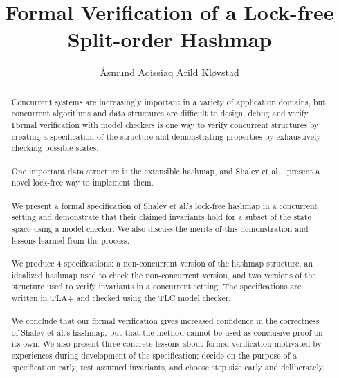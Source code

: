 \documentclass{uit-thesis}
\begin{document}
\title{Formal Verification of a Lock-free Split-order Hashmap}
\author{Åsmund Aqissiaq Arild Kløvstad}

\maketitle

\frontmatter

\begin{epigraph}
\end{epigraph}

\tableofcontents

\begin{abstract}
    Concurrent systems are increasingly important in a variety of application domains, but concurrent algorithms and data structures are difficult to design, debug and verify. Formal verification with model checkers is one way to verify concurrent structures by creating a specification of the structure and demonstrating properties by exhaustively checking possible states.\\\\
    One important data structure is the extensible hashmap, and Shalev et al.~\cite{Shalev2006} present a novel lock-free way to implement them.
    \\\\%
    We present a formal specification of Shalev et al.'s lock-free hashmap in a concurrent setting and demonstrate that their claimed invariants hold for a subset of the state space using a model checker. We also discuss the merits of this demonstration and lessons learned from the process.
    \\\\%
    We produce 4 specifications: a non-concurrent version of the hashmap structure, an idealized hashmap used to check the non-concurrent version, and two versions of the structure used to verify invariants in a concurrent setting. The specifications are written in TLA+ and checked using the TLC model checker.
    \\\\%
    We conclude that our formal verification gives increased confidence in the correctness of Shalev et al.'s hashmap, but that the method cannot be used as conclusive proof on its own. We also present three concrete lessons about formal verification motivated by experiences during development of the specification; decide on the purpose of a specification early, test assumed invariants, and choose step size early and deliberately.
\end{abstract}
\end{document}

